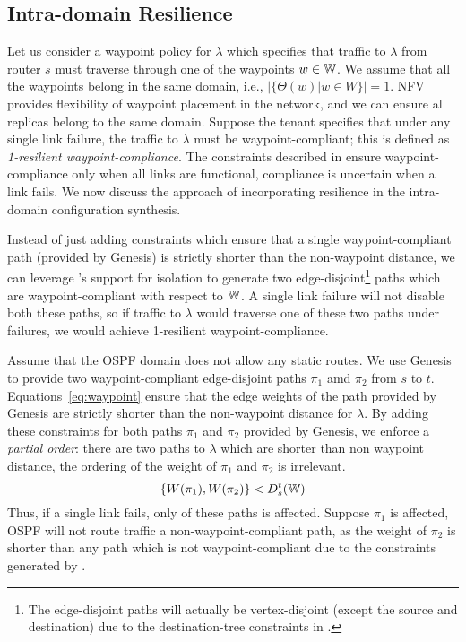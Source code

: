 \subsection{Intra-domain Resilience} \label{sec:ospfresilience}
Let us consider a waypoint policy for $\lambda$ which
specifies that traffic to $\lambda$ from router $s$ 
must traverse through
one of the waypoints $w \in \mathbb{W}$. We assume that 
all the waypoints belong in the same domain, i.e., 
$|\{\Theta(w) | w \in W\}| = 1$. NFV provides 
flexibility of waypoint placement in the network, 
and we can ensure
all replicas belong to the same domain.  
Suppose the tenant 
specifies that under any single link failure, the traffic 
to $\lambda$ must be waypoint-compliant; this is defined 
as \emph{1-resilient waypoint-compliance}. The constraints 
described in  ensure waypoint-compliance
only when all links are functional, compliance is uncertain
when a link fails. We now discuss the approach of incorporating
resilience in the intra-domain configuration synthesis.

Instead of just adding constraints which ensure that a single 
waypoint-compliant path (provided by Genesis) is strictly 
shorter than the non-waypoint distance, we can leverage \genesis's
support for isolation to generate two edge-disjoint\footnote
{The edge-disjoint paths will actually be vertex-disjoint (except the 
	source and destination) due to the destination-tree constraints
	in \genesis.} paths
which are waypoint-compliant with respect to $\mathbb{W}$. A single link
failure will not disable both these paths, so if traffic to $\lambda$ 
would 
traverse one of these two paths under failures, 
we would achieve 1-resilient
waypoint-compliance. 

Assume that the OSPF domain does not allow any static routes. 
We use Genesis to provide two waypoint-compliant 
edge-disjoint paths $\pi_1$ amd $\pi_2$ from $s$ to $t$.
Equations~\ref{eq:waypoint} ensure that the edge weights 
of the path provided by Genesis are strictly shorter than 
the non-waypoint distance for $\lambda$. By adding these
constraints for both paths $\pi_1$ and $\pi_2$ provided by Genesis,
we enforce a \emph{partial order}: there are two paths to $\lambda$
which are shorter than non waypoint distance, the 
ordering of the weight of $\pi_1$ and $\pi_2$ is irrelevant. 
\begin{equation} \label{eq:resilience}
\{ W(\pi_1), W(\pi_2) \} < D^t_s(\mathbb{W}) 
\end{equation}
Thus, if a single link fails, only of these paths is affected. Suppose
$\pi_1$ is affected, OSPF will not route traffic a  
non-waypoint-compliant path, as the weight of $\pi_2$ is shorter than any path which is not waypoint-compliant due to the constraints generated 
by \name.

